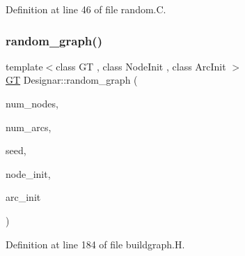 Definition at line 46 of file random.\+C.

\mbox{\label{namespace_designar_aee2e3d201a649a468dbe1def58fd285a}} 
\subsubsection{\texorpdfstring{random\+\_\+graph()}{random\_graph()}\hspace{0.1cm}{\footnotesize\ttfamily [1/3]}}
{\footnotesize\ttfamily template$<$class GT , class Node\+Init , class Arc\+Init $>$ \\
\hyperlink{demo-buildgraph_8_c_a3001c40d2c31ca87ed96cd7d1334a55e}{GT} Designar\+::random\+\_\+graph (\begin{DoxyParamCaption}\item[{\hyperlink{namespace_designar_aa72662848b9f4815e7bf31a7cf3e33d1}{nat\+\_\+t}}]{num\+\_\+nodes,  }\item[{\hyperlink{namespace_designar_aa72662848b9f4815e7bf31a7cf3e33d1}{nat\+\_\+t}}]{num\+\_\+arcs,  }\item[{\hyperlink{namespace_designar_ad621b5646d45288c5d6a1e1dfe7531a8}{rng\+\_\+seed\+\_\+t}}]{seed,  }\item[{Node\+Init \&}]{node\+\_\+init,  }\item[{Arc\+Init \&}]{arc\+\_\+init }\end{DoxyParamCaption})}



Definition at line 184 of file buildgraph.\+H.

\mbox{\label{namespace_designar_ae9fce2578ac6b598baf1ecb7e38f77cf}} 
